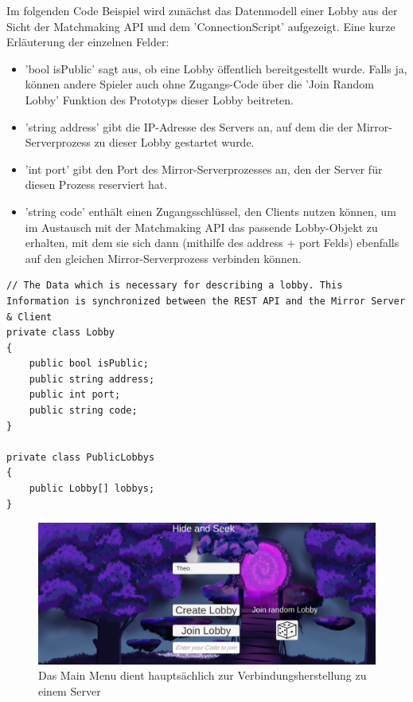 Im folgenden Code Beispiel wird zunächst das Datenmodell einer Lobby aus der Sicht der Matchmaking API und dem 'ConnectionScript' aufgezeigt. Eine kurze Erläuterung der einzelnen Felder:

\begin{itemize}
	\item 'bool isPublic' sagt aus, ob eine Lobby öffentlich bereitgestellt wurde. Falls ja, können andere Spieler auch ohne Zugangs-Code über die 'Join Random Lobby' Funktion des Prototyps dieser Lobby beitreten.
	\item 'string address' gibt die IP-Adresse des Servers an, auf dem die der Mirror-Serverprozess zu dieser Lobby gestartet wurde.
	\item 'int port' gibt den Port des Mirror-Serverprozesses an, den der Server für diesen Prozess reserviert hat.
	\item 'string code' enthält einen Zugangsschlüssel, den Clients nutzen können, um im Austausch mit der Matchmaking API das passende Lobby-Objekt zu erhalten, mit dem sie sich dann (mithilfe des address + port Felds) ebenfalls auf den gleichen Mirror-Serverprozess verbinden können.
\end{itemize}

\begin{lstlisting}[caption= ConnectionScript.cs Matchmaking Data]
// The Data which is necessary for describing a lobby. This Information is synchronized between the REST API and the Mirror Server & Client
private class Lobby
{
	public bool isPublic;
	public string address;
	public int port;
	public string code;
}

private class PublicLobbys
{
	public Lobby[] lobbys;
}
\end{lstlisting}

\begin{figure}[H]
	\centering
	\includegraphics[width=120mm]{images/prototyp_main_menu.png}
	\caption[Prototyp Main Menu]{Das Main Menu dient hauptsächlich zur Verbindungsherstellung zu einem Server}
	\label{pic:prototyp_main_menu}
\end{figure}

